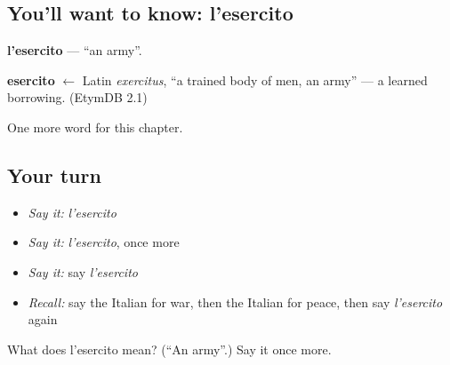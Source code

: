 \subsection*{You'll want to know: l'esercito}
\textbf{l'esercito} — \textquotedblleft{}an army\textquotedblright{}.

\begin{cousinweb}
\textbf{esercito} $\leftarrow$ Latin \emph{exercitus}, \textquotedblleft{}a trained body of men, an army\textquotedblright{} — a learned borrowing. (EtymDB 2.1)
\end{cousinweb}

\begin{grammarlens}[title={What you've built}]
One more word for this chapter.
\end{grammarlens}

\subsection*{Your turn}
\begin{itemize}
\raggedright
  \item \emph{Say it:} \emph{l'esercito}
  \item \emph{Say it:} \emph{l'esercito}, once more
  \item \emph{Say it:} say \emph{l'esercito}
  \item \emph{Recall:} say the Italian for war, then the Italian for peace, then say \emph{l'esercito} again
\end{itemize}

\begin{tcolorbox}[breakable,colback=teal!4,colframe=teal!35!black,title={Before you move on}]
What does l'esercito mean? (\textquotedblleft{}An army\textquotedblright{}.) Say it once more.
\end{tcolorbox}
